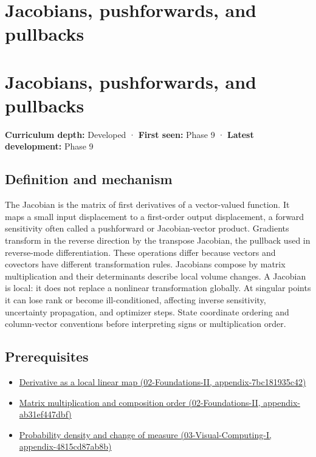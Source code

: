 \hypertarget{appendix-d8a7ddb675eb}{}
\section*{Jacobians, pushforwards, and pullbacks}
\section{Jacobians, pushforwards, and pullbacks}\label{appendix-d8a7ddb675eb-jacobians-pushforwards-and-pullbacks}

\textbf{Curriculum depth:} Developed · \textbf{First seen:} Phase 9 · \textbf{Latest development:} Phase 9

\subsection{Definition and mechanism}\label{appendix-d8a7ddb675eb-definition-and-mechanism}

The Jacobian is the matrix of first derivatives of a vector-valued function. It maps a small input displacement to a first-order output displacement, a forward sensitivity often called a pushforward or Jacobian-vector product. Gradients transform in the reverse direction by the transpose Jacobian, the pullback used in reverse-mode differentiation. These operations differ because vectors and covectors have different transformation rules. Jacobians compose by matrix multiplication and their determinants describe local volume changes. A Jacobian is local: it does not replace a nonlinear transformation globally. At singular points it can lose rank or become ill-conditioned, affecting inverse sensitivity, uncertainty propagation, and optimizer steps. State coordinate ordering and column-vector conventions before interpreting signs or multiplication order.

\subsection{Prerequisites}\label{appendix-d8a7ddb675eb-prerequisites}

\begin{itemize}
\tightlist
\item
  \href{../02-Foundations-II/main.pdf\#nameddest=appendix-7bc181935c42}{Derivative as a local linear map (02-Foundations-II, appendix-7bc181935c42)}
\item
  \href{../02-Foundations-II/main.pdf\#nameddest=appendix-ab31ef447dbf}{Matrix multiplication and composition order (02-Foundations-II, appendix-ab31ef447dbf)}
\item
  \href{../03-Visual-Computing-I/main.pdf\#nameddest=appendix-4815cd87ab8b}{Probability density and change of measure (03-Visual-Computing-I, appendix-4815cd87ab8b)}
\end{itemize}

